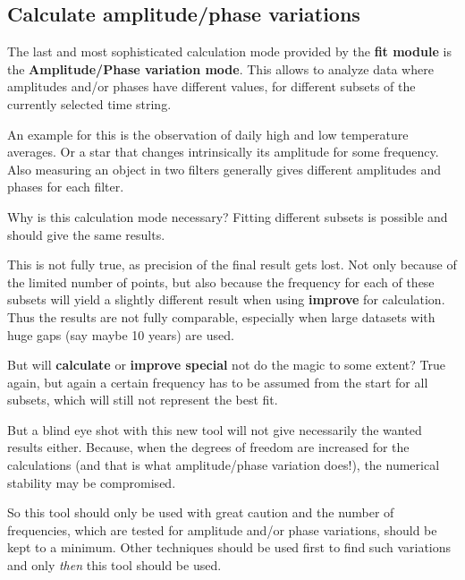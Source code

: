 

\subsection{Calculate amplitude/phase variations}%
\label{period.ampvar}

The last and most sophisticated calculation mode provided by the
{\bf fit module} is the {\bf Amplitude/Phase variation mode}.
This allows to analyze data where 
amplitudes and/or phases have different values, for different subsets 
of the currently selected time string.

An example for this is the observation of daily 
high and low temperature averages.
Or a star that changes intrinsically its amplitude for some frequency. 
Also measuring an object in two filters generally gives different amplitudes
and phases for each filter.

Why is this calculation mode necessary? 
Fitting different subsets is possible 
and should give the same results.

This is not fully true, as precision of the final result
gets lost. Not only because of the limited number of points, but also
because the frequency for each of these subsets will yield a slightly 
different result when using {\bf improve} for calculation. 
Thus the results are not fully comparable, especially when large datasets
with huge gaps (say maybe 10 years) are used.

But will {\bf calculate} or {\bf improve special} not do the magic to 
some extent? True again, but again a certain frequency has to be assumed
from the start for all subsets, which will still not represent the
best fit.

But a blind eye shot with this new tool will not give necessarily the
wanted results either. Because, when the degrees of freedom are increased
for the calculations (and that is what amplitude/phase variation does!),
the numerical stability may be compromised.

So this tool should only be used with great caution and the 
number of frequencies,
which are tested for amplitude and/or phase variations, should be kept 
to a minimum. Other techniques should be used first to find such variations
and only {\it then} this tool should be used.

